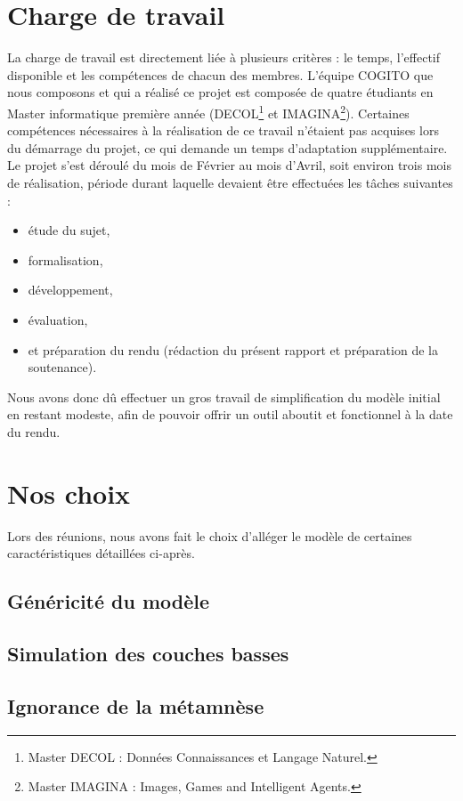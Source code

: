 \section{Charge de travail}
La charge de travail est directement liée à plusieurs critères : le temps,
l'effectif disponible et les compétences de chacun des membres. L'équipe COGITO que nous 
composons et qui a réalisé ce projet est composée de
quatre étudiants en Master informatique première année (DECOL\footnote{Master
DECOL : Données Connaissances et Langage Naturel.} et IMAGINA\footnote{Master
IMAGINA : Images, Games and Intelligent Agents.}). Certaines compétences 
nécessaires à la réalisation de ce travail n'étaient pas
acquises lors du démarrage du projet, ce qui demande un temps d'adaptation
supplémentaire. Le projet s'est déroulé du mois de Février au mois d'Avril, soit environ trois
mois de réalisation, période durant laquelle devaient être effectuées les tâches
suivantes :

\begin{itemize}
\item étude du sujet, 
\item formalisation, 
\item développement, 
\item évaluation,
\item et préparation du rendu (rédaction du présent rapport et préparation de la soutenance).
\end{itemize}

Nous avons donc dû effectuer un gros travail de simplification du modèle initial en restant modeste, afin de pouvoir offrir un outil aboutit et fonctionnel à la date du rendu.

\section{Nos choix}

Lors des réunions, nous avons fait le choix d'alléger le modèle de certaines caractéristiques détaillées ci-après.

\subsection{Généricité du modèle}
\subsection{Simulation des couches basses}
\subsection{Ignorance de la métamnèse}